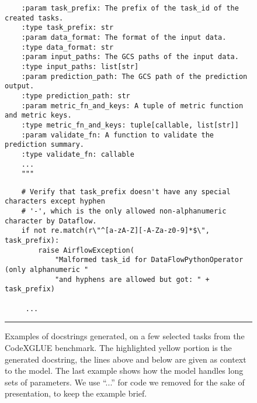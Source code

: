 \documentclass[10pt]{article}
\begin{document}
{\begin{figure}
\begin{verbatim}
    :param task_prefix: The prefix of the task_id of the created tasks.
    :type task_prefix: str
    :param data_format: The format of the input data.
    :type data_format: str
    :param input_paths: The GCS paths of the input data.
    :type input_paths: list[str]
    :param prediction_path: The GCS path of the prediction output.
    :type prediction_path: str
    :param metric_fn_and_keys: A tuple of metric function and metric keys.
    :type metric_fn_and_keys: tuple[callable, list[str]]
    :param validate_fn: A function to validate the prediction summary.
    :type validate_fn: callable
    ...
    """
\end{verbatim}
\vspace{-0.8cm}
\begin{verbatim}
    # Verify that task_prefix doesn't have any special characters except hyphen
    # '-', which is the only allowed non-alphanumeric character by Dataflow.
    if not re.match(r\"^[a-zA-Z][-A-Za-z0-9]*$\", task_prefix):
        raise AirflowException(
            "Malformed task_id for DataFlowPythonOperator (only alphanumeric "
            "and hyphens are allowed but got: " + task_prefix)

     ...
\end{verbatim}
\vspace{-0.5cm}           
     
\noindent\rule{\textwidth}{1pt}
\caption{Examples of docstrings generated, on a few selected tasks from the CodeXGLUE benchmark. The highlighted yellow portion is the generated docstring, the lines above and below are given as context to the model. The last example shows how the model handles long sets of parameters. We use ``...'' for code we removed for the sake of presentation, to keep the example brief.}
    \label{fig:examples_infilling_codexglue}
\end{figure}

}
\end{document}
